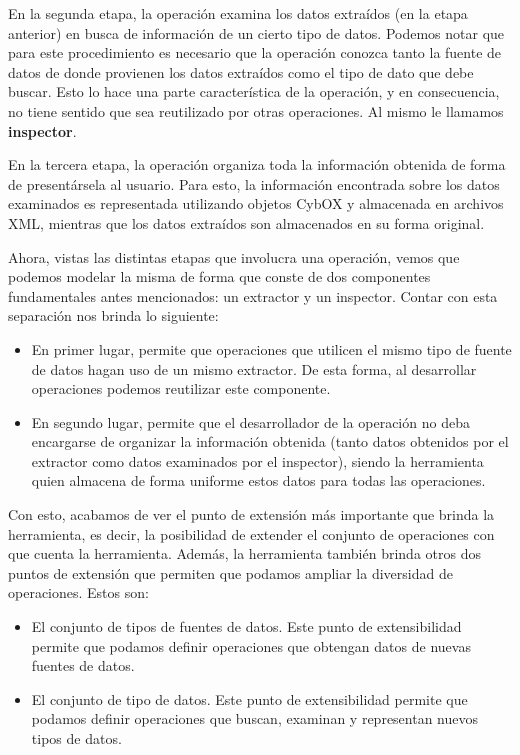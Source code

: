 En la segunda etapa, la operación examina los datos extraídos (en la etapa anterior) en busca de información de un cierto tipo de datos. Podemos notar que para este procedimiento es necesario que la operación conozca tanto la fuente de datos de donde provienen los datos extraídos como el tipo de dato que debe buscar. Esto lo hace una parte característica de la operación, y en consecuencia, no tiene sentido que sea reutilizado por otras operaciones. Al mismo le llamamos \textbf{inspector}.

En la tercera etapa, la operación organiza toda la información obtenida de forma de presentársela al usuario. Para esto, la información encontrada sobre los datos examinados es representada utilizando objetos CybOX y almacenada en archivos XML, mientras que los datos extraídos son almacenados en su forma original.

Ahora, vistas las distintas etapas que involucra una operación, vemos que podemos modelar la misma de forma que conste de dos componentes fundamentales antes mencionados: un extractor y un inspector. Contar con esta separación nos brinda lo siguiente:

\begin{itemize}
\item En primer lugar, permite que operaciones que utilicen el mismo tipo de fuente de datos hagan uso de un mismo extractor. De esta forma, al desarrollar operaciones podemos reutilizar este componente.
\item En segundo lugar, permite que el desarrollador de la operación no deba encargarse de organizar la información obtenida (tanto datos obtenidos por el extractor como datos examinados por el inspector), siendo la herramienta quien almacena de forma uniforme estos datos para todas las operaciones.
\end{itemize}

Con esto, acabamos de ver el punto de extensión más importante que brinda la herramienta, es decir, la posibilidad de extender el conjunto de operaciones con que cuenta la herramienta. Además, la herramienta también brinda otros dos puntos de extensión que permiten que podamos ampliar la diversidad de operaciones. Estos son:
\begin{itemize}
\item El conjunto de tipos de fuentes de datos. Este punto de extensibilidad permite que podamos definir operaciones que obtengan datos de nuevas fuentes de datos.
\item El conjunto de tipo de datos. Este punto de extensibilidad permite que podamos definir operaciones que buscan, examinan y representan nuevos tipos de datos.
\end{itemize}

